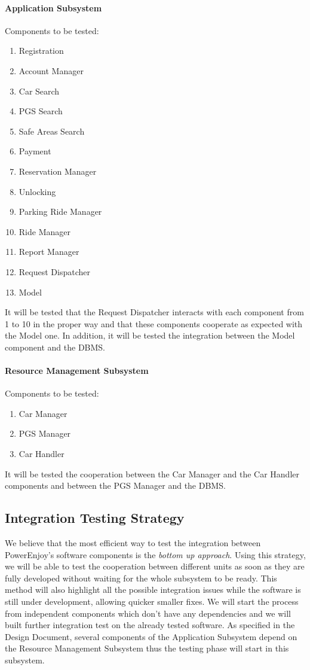 \documentclass[english]{article}
\begin{document}
\paragraph{Application Subsystem}
Components to be tested:
\begin{enumerate}
\item Registration
\item Account Manager
\item Car Search
\item PGS Search
\item Safe Areas Search
\item Payment
\item Reservation Manager
\item Unlocking
\item Parking Ride Manager
\item Ride Manager
\item Report Manager
\item Request Dispatcher
\item Model
\end{enumerate}

It will be tested that the Request Dispatcher interacts with each component from 1 to 10 in the proper way and that these components cooperate as expected with the Model one. In addition, it will be tested the integration between the Model component and the DBMS.

\paragraph{Resource Management Subsystem}
Components to be tested:
\begin{enumerate}
\item Car Manager
\item PGS Manager
\item Car Handler
\end{enumerate}

It will be tested the cooperation between the Car Manager and the Car Handler components and between the PGS Manager and the DBMS.



\subsection{Integration Testing Strategy}
We believe that the most efficient way to test the integration between PowerEnjoy's software components is the \emph{bottom up approach}. Using this strategy, we will be able to test the cooperation between different units as soon as they are fully developed without waiting for the whole subsystem to be ready. This method will also highlight all the possible integration issues while the software is still under development, allowing quicker smaller fixes.
We will start the process from independent components which don't have any dependencies and we will built further integration test on the already  tested software.
As specified in the Design Document, several components of the Application Subsystem depend on the Resource Management Subsystem thus the testing phase will start in this subsystem.
\end{document}
